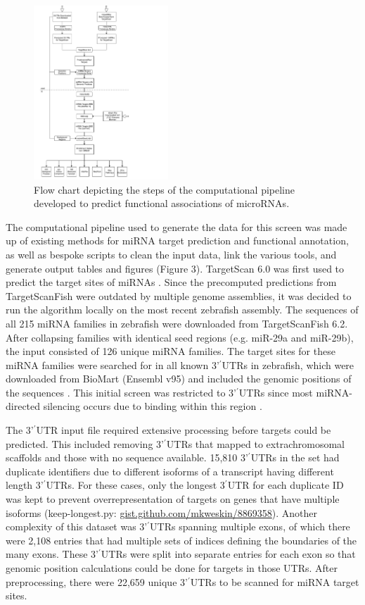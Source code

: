 \documentclass[12pt]{article}
\begin{document}
\begin{figure}
\centering
\includegraphics[width=0.45\textwidth]{figures/pipeline.pdf}
\caption[Computational Pipeline]{Flow chart depicting the steps of the computational pipeline developed to predict functional associations of microRNAs.}
\label{1}
\end{figure}
The computational pipeline used to generate the data for this screen was made up of existing methods for miRNA target prediction and functional annotation, as well as bespoke scripts to clean the input data, link the various tools, and generate output tables and figures (Figure 3). TargetScan 6.0 was first used to predict the target sites of miRNAs \cite{lewis2005conserved}. Since the precomputed predictions from TargetScanFish were outdated by multiple genome assemblies, it was decided to run the algorithm locally on the most recent zebrafish assembly. The sequences of all 215 miRNA families in zebrafish were downloaded from TargetScanFish 6.2. After collapsing families with identical seed regions (e.g. miR-29a and miR-29b), the input consisted of 126 unique miRNA families. The target sites for these miRNA families were searched for in all known 3’$^\prime$UTRs in zebrafish, which were downloaded from BioMart (Ensembl v95) and included the genomic positions of the sequences \cite{zerbino2017ensembl}. This initial screen was restricted to 3’$^\prime$UTRs since most miRNA-directed silencing occurs due to binding within this region \cite{bartel2009micrornas}.

The 3’$^\prime$UTR input file required extensive processing before targets could be predicted. This included removing 3’$^\prime$UTRs that mapped to extrachromosomal scaffolds and those with no sequence available. 15,810 3’$^\prime$UTRs in the set had duplicate identifiers due to different isoforms of a transcript having different length 3’$^\prime$UTRs. For these cases, only the longest 3$^\prime$UTR for each duplicate ID was kept to prevent overrepresentation of targets on genes that have multiple isoforms (keep-longest.py: \url{gist.github.com/mkweskin/8869358}). Another complexity of this dataset was 3’$^\prime$UTRs spanning multiple exons, of which there were 2,108 entries that had multiple sets of indices defining the boundaries of the many exons. These 3’$^\prime$UTRs were split into separate entries for each exon so that genomic position calculations could be done for targets in those UTRs. After preprocessing, there were 22,659 unique 3’$^\prime$UTRs to be scanned for miRNA target sites.
\end{document}
